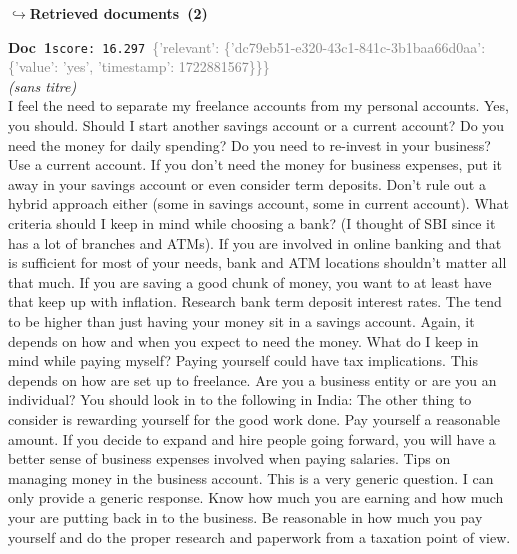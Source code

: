 \documentclass[a4paper,11pt]{article}
\begin{document}
\noindent\hfill{\footnotesize\textcolor{doccolor}{\textbf{$\hookrightarrow$\enspace Retrieved documents~(2)}}}
\begin{docenv}
{\footnotesize\textcolor{doccolor}{\textbf{Doc~1}}}\hfill{\tiny\texttt{score:~16.297}}\ {\tiny\textcolor{gray}{\{'relevant': \{'dc79eb51-e320-43c1-841c-3b1baa66d0aa': \{'value': 'yes', 'timestamp': 1722881567\}\}\}}}\\[3pt]
{\small\textit{(sans titre)}}\\[2pt]
\vspace{2pt}
{\footnotesize 
I feel the need to separate my freelance accounts from my personal accounts. Yes, you should. Should I start another savings account or a current account? Do you need the money for daily spending? Do you need to re-invest in your business? Use a current account. If you don't need the money for business expenses, put it away in your savings account or even consider term deposits. Don't rule out a hybrid approach either (some in savings account, some in current account). What criteria should I keep in mind while choosing a bank? (I thought of SBI since it has a lot of branches and ATMs). If you are involved in online banking and that is sufficient for most of your needs, bank and ATM locations shouldn't matter all that much. If you are saving a good chunk of money, you want to at least have that keep up with inflation. Research bank term deposit interest rates. The tend to be higher than just having your money sit in a savings account. Again, it depends on how and when you expect to need the money. What do I keep in mind while paying myself? Paying yourself could have tax implications. This depends on how are set up to freelance. Are you a business entity or are you an individual? You should look in to the following in India: The other thing to consider is rewarding yourself for the good work done. Pay yourself a reasonable amount. If you decide to expand and hire people going forward, you will have a better sense of business expenses involved when paying salaries. Tips on managing money in the business account. This is a very generic question. I can only provide a generic response. Know how much you are earning and how much your are putting back in to the business. Be reasonable in how much you pay yourself and do the proper research and paperwork from a taxation point of view.}
\end{docenv}
\end{document}
